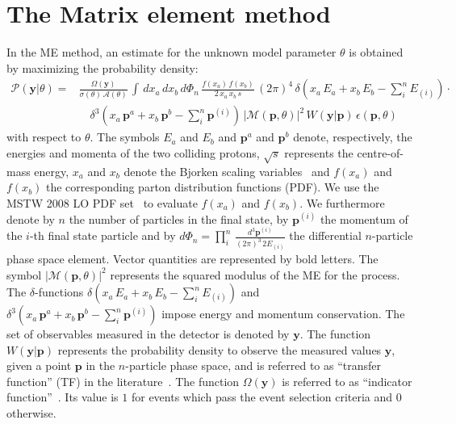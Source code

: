 \section{The Matrix element method}
\label{sec:mem}

In the ME method, an estimate for the unknown model parameter $\theta$
is obtained by maximizing the probability density:
\begin{align}
\mathcal{P}(\bm{y}|\theta) = & \frac{\Omega(\bm{y})}{\sigma(\theta) \,
\mathcal{A}(\theta)} \, \int \, dx_{a} \, dx_{b} \,
d\Phi_{n} \, \frac{f(x_{a}) \, f(x_{b})}{2 \, x_{a} \, x_{b} \, s} \, (2\pi)^{4} \,
\delta( x_{a} \, E_{a} + x_{b} \, E_{b} - \sum_{i}^{n}
E_{(i)}) \cdot \nonumber \\
 & \quad \delta^{3}( x_{a} \, \bm{p}^{a} + x_{b} \, \bm{p}^{b} - \sum_{i}^{n}
\bm{p}^{(i)}) \, 
  \vert \mathcal{M}(\bm{p},\theta) \vert^{2} \, W(\bm{y}|\bm{p}) \,
  \epsilon(\bm{p},\theta) 
\label{eq:mem}
\end{align}
with respect to $\theta$.
The symbols $E_{a}$ and $E_{b}$ and $\bm{p}^{a}$ and $\bm{p}^{b}$ denote, respectively, the energies and momenta of the two colliding protons,
$\sqrt{s}$ represents the centre-of-mass energy,
$x_{a}$ and $x_{b}$ denote the Bjorken scaling variables~\cite{Bjorkenx}
and $f(x_{a})$ and $f(x_{b})$ the corresponding parton distribution
functions (PDF).
We use the MSTW 2008 LO PDF set~\cite{MSTW} to evaluate $f(x_{a})$ and $f(x_{b})$.
We furthermore denote by $n$ the number of particles in the final state,
by $\bm{p}^{(i)}$ the momentum of the $i$-th final state particle
and by $d\Phi_{n} = \prod_{i}^{n} \,
\frac{d^{3}\bm{p}^{(i)}}{(2\pi)^{3} \, 2 E_{(i)}}$ the differential $n$-particle
phase space element.
Vector quantities are represented by bold letters.
The symbol $\vert \mathcal{M}(\bm{p},\theta) \vert^{2}$ represents the
squared modulus of the ME for
the process.
The $\delta$-functions $\delta( x_{a} \, E_{a} + x_{b} \, E_{b} - \sum_{i}^{n} E_{(i)})$
and $\delta^{3}( x_{a} \, \bm{p}^{a} + x_{b} \, \bm{p}^{b} - \sum_{i}^{n} \bm{p}^{(i)})$ 
impose energy and momentum conservation.
The set of observables measured in the
detector is denoted by $\bm{y}$.
The function $W(\bm{y}|\bm{p})$ represents the probability density to
observe the measured values $\bm{y}$, given a point $\bm{p}$ in the
$n$-particle phase space, and
is referred to as ``transfer function'' (TF) in the
literature~\cite{Fiedler:2010sg,Volobouev:2011vb}.
The function $\Omega(\bm{y})$ is referred to as ``indicator function''~\cite{Volobouev:2011vb}. 
Its value is $1$ for events which pass the event selection criteria and $0$ otherwise.
